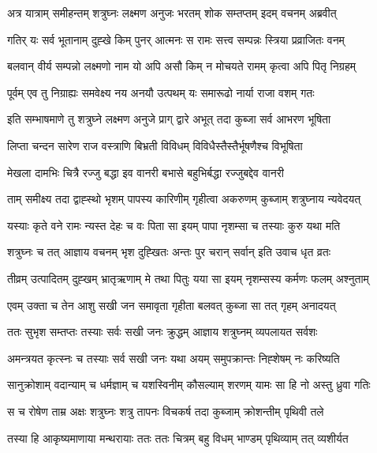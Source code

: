 
\twolineshloka
{अत्र यात्राम् समीहन्तम् शत्रुघ्नः लक्ष्मण अनुजः}
{भरतम् शोक सम्तप्तम् इदम् वचनम् अब्रवीत्} %

\twolineshloka
{गतिर् यः सर्व भूतानाम् दुह्खे किम् पुनर् आत्मनः}
{स रामः सत्त्व सम्पन्नः स्त्रिया प्रव्राजितः वनम्} %

\twolineshloka
{बलवान् वीर्य सम्पन्नो लक्ष्मणो नाम यो अपि असौ}
{किम् न मोचयते रामम् कृत्वा अपि पितृ निग्रहम्} %

\twolineshloka
{पूर्वम् एव तु निग्राह्यः समवेक्ष्य नय अनयौ}
{उत्पथम् यः समारूढो नार्या राजा वशम् गतः} %

\twolineshloka
{इति सम्भाषमाणे तु शत्रुघ्ने लक्ष्मण अनुजे}
{प्राग् द्वारे अभूत् तदा कुब्जा सर्व आभरण भूषिता} %

\twolineshloka
{लिप्ता चन्दन सारेण राज वस्त्राणि बिभ्रती}
{विविधम् विविधैस्तैस्तैर्भूषणैश्च विभूषिता} %

\twolineshloka
{मेखला दामभिः चित्रै रज्जु बद्धा इव वानरी}
{बभासे बहुभिर्बद्धा रज्जुबद्देव वानरी} %

\twolineshloka
{ताम् समीक्ष्य तदा द्वाह्स्थो भृशम् पापस्य कारिणीम्}
{गृहीत्वा अकरुणम् कुब्जाम् शत्रुघ्नाय न्यवेदयत्} %

\twolineshloka
{यस्याः कृते वने रामः न्यस्त देहः च वः पिता}
{सा इयम् पापा नृशम्सा च तस्याः कुरु यथा मति} %

\twolineshloka
{शत्रुघ्नः च तत् आज्ञाय वचनम् भृश दुह्खितः}
{अन्तः पुर चरान् सर्वान् इति उवाच धृत व्रतः} %

\twolineshloka
{तीव्रम् उत्पादितम् दुह्खम् भ्रातृऋणाम् मे तथा पितुः}
{यया सा इयम् नृशम्सस्य कर्मणः फलम् अश्नुताम्} %

\twolineshloka
{एवम् उक्ता च तेन आशु सखी जन समावृता}
{गृहीता बलवत् कुब्जा सा तत् गृहम् अनादयत्} %

\twolineshloka
{ततः सुभृश सम्तप्तः तस्याः सर्वः सखी जनः}
{क्रुद्धम् आज्ञाय शत्रुघ्नम् व्यपलायत सर्वशः} %

\twolineshloka
{अमन्त्रयत कृत्स्नः च तस्याः सर्व सखी जनः}
{यथा अयम् समुपक्रान्तः निह्शेषम् नः करिष्यति} %

\twolineshloka
{सानुक्रोशाम् वदान्याम् च धर्मज्ञाम् च यशस्विनीम्}
{कौसल्याम् शरणम् यामः सा हि नो अस्तु ध्रुवा गतिः} %

\twolineshloka
{स च रोषेण ताम्र अक्षः शत्रुघ्नः शत्रु तापनः}
{विचकर्ष तदा कुब्जाम् क्रोशन्तीम् पृथिवी तले} %

\twolineshloka
{तस्या हि आकृष्यमाणाया मन्थरायाः ततः ततः}
{चित्रम् बहु विधम् भाण्डम् पृथिव्याम् तत् व्यशीर्यत} %

